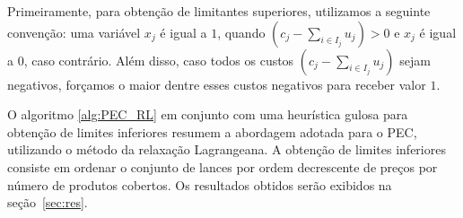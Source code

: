 \documentclass{article}
\begin{document}
	Primeiramente, para obtenção de limitantes superiores, utilizamos a seguinte convenção: uma variável $x_j$ é igual a $1$, quando $(c_{j} - \sum\limits_{i \in I_j} u_{j}) > 0$ e $x_j$ é igual a $0$, caso contrário. Além disso, caso todos os custos $(c_{j} - \sum\limits_{i \in I_j} u_{j})$ sejam negativos, forçamos o maior dentre esses custos negativos para receber valor $1$.
	
	O algoritmo \ref{alg:PEC_RL} em conjunto com uma heurística gulosa para obtenção de limites inferiores resumem a abordagem adotada para o PEC, utilizando o método da relaxação Lagrangeana. A obtenção de limites inferiores consiste em ordenar o conjunto de lances por ordem decrescente de preços por número de produtos cobertos.
	Os resultados obtidos serão exibidos na seção~\ref{sec:res}.
	
\end{document}
